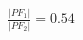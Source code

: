 \documentclass[preview]{standalone}
\begin{document}
\begin{align*}
\frac{|PF_1|}{|PF_2|} = 0.54
\end{align*}
\end{document}
